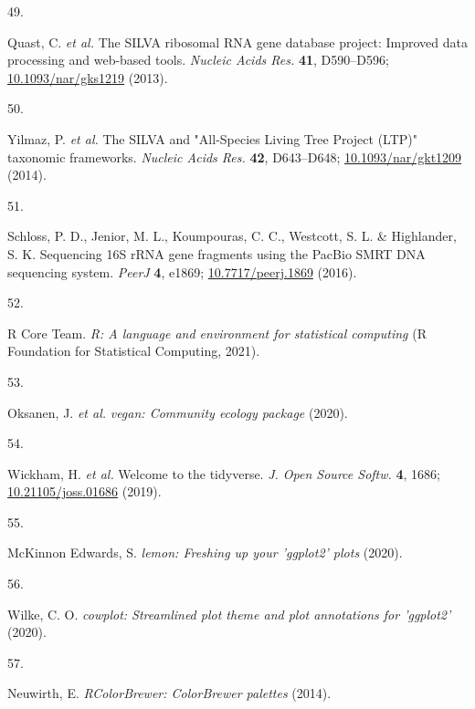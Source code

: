 \documentclass[
  12pt,
]{article}
\newlength{\cslhangindent}
\newlength{\csllabelwidth}
\newlength{\cslentryspacingunit} %
\newenvironment{CSLReferences}[2] %
 {%
  \setlength{\parindent}{0pt}
  \ifodd #1
  \let\oldpar\par
  \def\par{\hangindent=\cslhangindent\oldpar}
  \fi
  \setlength{\parskip}{#2\cslentryspacingunit}
 }%
 {}
\newcommand{\CSLLeftMargin}[1]{\parbox[t]{\csllabelwidth}{#1}}
\newcommand{\CSLRightInline}[1]{\parbox[t]{\linewidth - \csllabelwidth}{#1}\break}
\begin{document}
\begin{CSLReferences}{0}{0}
\leavevmode{}%
\CSLLeftMargin{49. }
\CSLRightInline{Quast, C. \emph{et al.} The {SILVA} ribosomal {RNA} gene
database project: Improved data processing and web-based tools.
\emph{Nucleic Acids Res.} \textbf{41}, D590--D596;
\href{https://doi.org/10.1093/nar/gks1219}{10.1093/nar/gks1219} (2013).}

\leavevmode{}%
\CSLLeftMargin{50. }
\CSLRightInline{Yilmaz, P. \emph{et al.} The {SILVA} and "{All-Species
Living Tree Project} ({LTP})" taxonomic frameworks. \emph{Nucleic Acids
Res.} \textbf{42}, D643--D648;
\href{https://doi.org/10.1093/nar/gkt1209}{10.1093/nar/gkt1209} (2014).}

\leavevmode{}%
\CSLLeftMargin{51. }
\CSLRightInline{Schloss, P. D., Jenior, M. L., Koumpouras, C. C.,
Westcott, S. L. \& Highlander, S. K. Sequencing {16S rRNA} gene
fragments using the {PacBio SMRT DNA} sequencing system. \emph{PeerJ}
\textbf{4}, e1869;
\href{https://doi.org/10.7717/peerj.1869}{10.7717/peerj.1869} (2016).}

\leavevmode{}%
\CSLLeftMargin{52. }
\CSLRightInline{R Core Team. \emph{R: {A} language and environment for
statistical computing} ({R Foundation for Statistical Computing},
2021).}

\leavevmode{}%
\CSLLeftMargin{53. }
\CSLRightInline{Oksanen, J. \emph{et al.} \emph{{vegan}: Community
ecology package} (2020).}

\leavevmode{}%
\CSLLeftMargin{54. }
\CSLRightInline{Wickham, H. \emph{et al.} Welcome to the tidyverse.
\emph{J. Open Source Softw.} \textbf{4}, 1686;
\href{https://doi.org/10.21105/joss.01686}{10.21105/joss.01686} (2019).}

\leavevmode{}%
\CSLLeftMargin{55. }
\CSLRightInline{McKinnon Edwards, S. \emph{{lemon}: Freshing up your
'ggplot2' plots} (2020).}

\leavevmode{}%
\CSLLeftMargin{56. }
\CSLRightInline{Wilke, C. O. \emph{{cowplot}: Streamlined plot theme and
plot annotations for {'ggplot2'}} (2020).}

\leavevmode{}%
\CSLLeftMargin{57. }
\CSLRightInline{Neuwirth, E. \emph{{RColorBrewer}: {ColorBrewer}
palettes} (2014).}


\end{CSLReferences}
\end{document}

